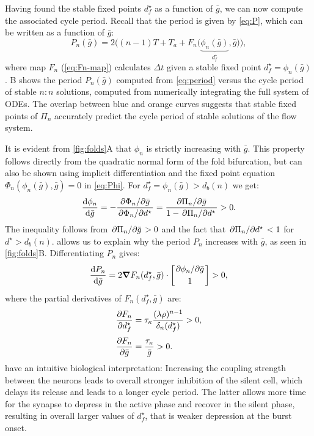 Having found the stable fixed points $d^\star_f$ as a function of $\bar g$, we can now compute the associated cycle period.
Recall that the period is given by \cref{eq:P}, which can be written as a function of $\bar g$:
\begin{equation}
	\label{eq:period}
	P_n(\bar g) = 2 \Big(
	(n-1)T + T_{a} + F_n\big(\underbrace{\phi_n(\bar g)}_{d^\star_f}, \bar g\big)
	\Big),
\end{equation}
where map $F_n$ (\cref{eq:Fn-map}) calculates $\Delta t$ given a stable fixed point $d^\star_f=\phi_n(\bar g)$.
B shows the period $P_{n}(\bar g)$ computed from \cref{eq:period} versus the cycle period of stable $n:n$ solutions, computed from numerically integrating the full system of ODEs.
The overlap between blue and orange curves suggests that stable fixed points of $\Pi_{n}$ accurately predict the cycle period of stable solutions of the flow system.


It is evident from \cref{fig:folds}A that $\phi_n$ is strictly increasing with $\bar g$.
This property follows directly from the quadratic normal form of the fold bifurcation, but can also be shown using implicit differentiation and the fixed point equation $\Phi_n(\phi_n(\bar g), \bar g)=0$ in \cref{eq:Phi}.
For $d^\star_f=\phi_n(\bar g)>d_b(n)$ we get:
\begin{equation}
	\label{eq:dstardg}
	\dv{\phi_n}{\bar g} = -\frac{\pdv*{\Phi_n}{\bar g}}{\pdv*{\Phi_n}{d^\star}} =
	\frac{\pdv*{\Pi_n}{\bar g}}{1-\pdv*{\Pi_n}{d^\star}}>0.
\end{equation}
The inequality follows from $\pdv*{\Pi_n}{\bar g}>0$ and the fact that $\pdv*{\Pi_n}{d^\star}<1$ for $d^\star>d_b(n)$.
 allows us to explain why the period $P_n$ increases with $\bar g$, as seen in \cref{fig:folds}B.
Differentiating $P_n$ gives:
\begin{equation}
	\label{eq:dPdg}
	\dv{P_{n}}{\bar g} = 2\grad F_n(d^\star_f, \bar g) \cdot
	\begin{bmatrix}\pdv*{\phi_n}{\bar g}\\[0.5ex] 1\end{bmatrix}>0,
\end{equation}
where the partial derivatives of $F_n(d^\star_f, \bar g)$ are:
\begin{align}
	\pdv{F_n}{d^\star_f} & = \tau_{\kappa} \frac{(\lambda\rho)^{n-1}}{\delta_n(d^\star_f)}>0, \\[0.5ex]
	\pdv{F_n}{\bar g}    & = \frac{\tau_{\kappa}}{\bar g}>0.
\end{align}
 have an intuitive biological interpretation: Increasing the coupling strength between the neurons leads to overall stronger inhibition of the silent cell, which delays its release and leads to a longer cycle period.
The latter allows more time for the synapse to depress in the active phase and recover in the silent phase, resulting in overall larger values of $d^\star_f$, that is weaker depression at the burst onset.

